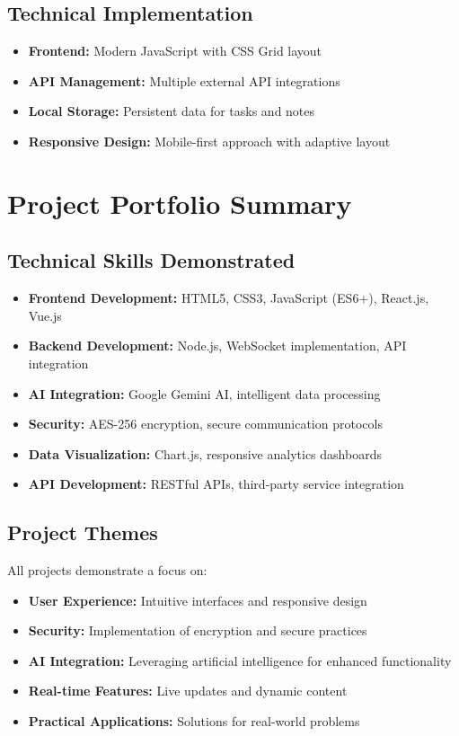 \documentclass[11pt,a4paper]{article}
\begin{document}
\subsection{Technical Implementation}
\begin{itemize}[leftmargin=1.5cm]
\item \textbf{Frontend:} Modern JavaScript with CSS Grid layout
\item \textbf{API Management:} Multiple external API integrations
\item \textbf{Local Storage:} Persistent data for tasks and notes
\item \textbf{Responsive Design:} Mobile-first approach with adaptive layout
\end{itemize}

\newpage

\section{Project Portfolio Summary}

\subsection{Technical Skills Demonstrated}
\begin{itemize}[leftmargin=1.5cm]
\item \textbf{Frontend Development:} HTML5, CSS3, JavaScript (ES6+), React.js, Vue.js
\item \textbf{Backend Development:} Node.js, WebSocket implementation, API integration
\item \textbf{AI Integration:} Google Gemini AI, intelligent data processing
\item \textbf{Security:} AES-256 encryption, secure communication protocols
\item \textbf{Data Visualization:} Chart.js, responsive analytics dashboards
\item \textbf{API Development:} RESTful APIs, third-party service integration
\end{itemize}

\subsection{Project Themes}
All projects demonstrate a focus on:
\begin{itemize}[leftmargin=1.5cm]
\item \textbf{User Experience:} Intuitive interfaces and responsive design
\item \textbf{Security:} Implementation of encryption and secure practices
\item \textbf{AI Integration:} Leveraging artificial intelligence for enhanced functionality
\item \textbf{Real-time Features:} Live updates and dynamic content
\item \textbf{Practical Applications:} Solutions for real-world problems
\end{itemize}
\end{document}
